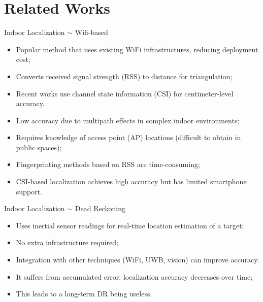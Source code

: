 \section{Related Works}
\begin{frame}{Indoor Localization $\sim$ Wifi-based}
	\begin{itemize}
		\item Popular method that uses existing WiFi infrastructures, reducing deployment cost;
		\item Converts received signal strength (RSS) to distance for triangulation;
		\item Recent works use channel state information (CSI) for centimeter-level accuracy.
	\end{itemize}
	\begin{itemize}
		\item Low accuracy due to multipath effects in complex indoor environments;
		\item Requires knowledge of access point (AP) locations (difficult to obtain in public spaces);
		\item Fingerprinting methods based on RSS are time-consuming;
		\item CSI-based localization achieves high accuracy but has limited smartphone support.
	\end{itemize}
\end{frame}

\begin{frame}{Indoor Localization $\sim$ Dead Reckoning}
	\begin{itemize}
		\item Uses inertial sensor readings for real-time location estimation of a target;
		\item No extra infrastructure required;
		\item Integration with other techniques (WiFi, UWB, vision) can improve accuracy.
	\end{itemize}
	\begin{itemize}
		\item It suffers from accumulated error: localization accuracy decreases over time;
		\item This leads to a long-term DR being useless.
	\end{itemize}
\end{frame}


